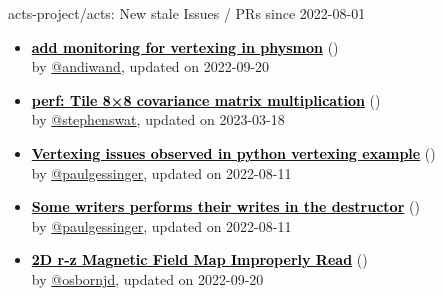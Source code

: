 \begin{frame}[allowframebreaks]{ acts-project/acts: New stale Issues / PRs since 2022-08-01 }
\begin{itemize}
    \item\iss\prstale\textbf{\href{https://github.com/acts-project/acts/issues/1313}{\textcolor{black}{add monitoring for vertexing in physmon}}}
    (\href{https://github.com/acts-project/acts/issues/1313}{}) \\
    by \href{https://github.com/andiwand}{@andiwand}, updated on 2022-09-20

    \item\propen\prstale\textbf{\href{https://github.com/acts-project/acts/pull/1181}{\textcolor{black}{perf: Tile 8×8 covariance matrix multiplication}}}
    (\href{https://github.com/acts-project/acts/pull/1181}{}) \\
    by \href{https://github.com/stephenswat}{@stephenswat}, updated on 2023-03-18

    \item\iss\prstale\textbf{\href{https://github.com/acts-project/acts/issues/1091}{\textcolor{black}{Vertexing issues observed in python vertexing example}}}
    (\href{https://github.com/acts-project/acts/issues/1091}{}) \\
    by \href{https://github.com/paulgessinger}{@paulgessinger}, updated on 2022-08-11

    \item\iss\prstale\textbf{\href{https://github.com/acts-project/acts/issues/881}{\textcolor{black}{Some writers performs their writes in the destructor}}}
    (\href{https://github.com/acts-project/acts/issues/881}{}) \\
    by \href{https://github.com/paulgessinger}{@paulgessinger}, updated on 2022-08-11

    \item\iss\prstale\textbf{\href{https://github.com/acts-project/acts/issues/669}{\textcolor{black}{2D r-z Magnetic Field Map Improperly Read}}}
    (\href{https://github.com/acts-project/acts/issues/669}{}) \\
    by \href{https://github.com/osbornjd}{@osbornjd}, updated on 2022-09-20

  \end{itemize}
\end{frame}



